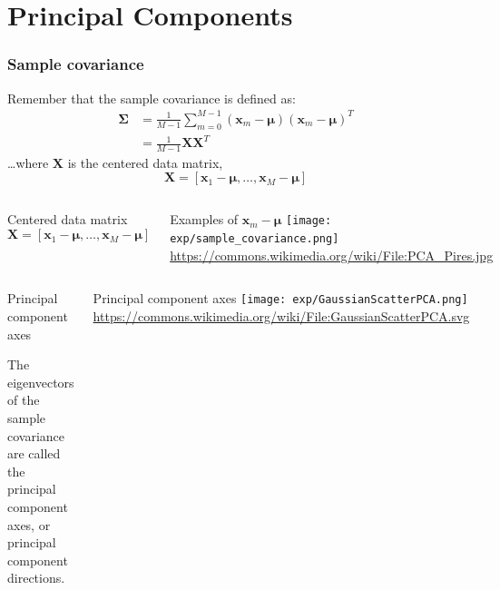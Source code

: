 \documentclass{beamer}
\begin{document}
\section[PCA]{Principal Components}
\setcounter{subsection}{1}

\begin{frame}
  \frametitle{Sample covariance}
  Remember that the sample covariance is defined as:
  \begin{align*}
    \bm{\Sigma}&=\frac{1}{M-1}\sum_{m=0}^{M-1}(\mathbf{x}_m-\bm{\mu})(\mathbf{x}_m-\bm{\mu})^T\\
    &=\frac{1}{M-1}\mathbf{X}\mathbf{X}^T
  \end{align*}
  \ldots where $\mathbf{X}$ is the centered data matrix,
  \[
  \mathbf{X}=\left[\mathbf{x}_1-\bm{\mu},\ldots,\mathbf{x}_{M}-\bm{\mu}\right]
  \]
\end{frame}

\begin{frame}
  \begin{columns}
    \column{1.75in}
    \begin{block}{Centered data matrix}
      \[
      \mathbf{X}=\left[
        \mathbf{x}_1-\bm{\mu},\ldots,\mathbf{x}_{M}-\bm{\mu}\right]
      \]
    \end{block}
    \column{2.625in}
    \begin{block}{Examples of $\mathbf{x}_m-\bm{\mu}$}
      \texttt{[image: exp/sample\_covariance.png]}
      {\footnotesize\url{https://commons.wikimedia.org/wiki/File:PCA_Pires.jpg}}
    \end{block}
  \end{columns}
\end{frame}

\begin{frame}
  \begin{columns}
    \column{1.75in}
    \begin{block}{Principal component axes}
      
      The eigenvectors of the sample covariance are called the
      principal component axes, or principal component directions.
    \end{block}
    \column{2.625in}
    \begin{block}{Principal component axes}
      \texttt{[image: exp/GaussianScatterPCA.png]}
      {\footnotesize\url{https://commons.wikimedia.org/wiki/File:GaussianScatterPCA.svg}}
    \end{block}
  \end{columns}
\end{frame}
\end{document}
